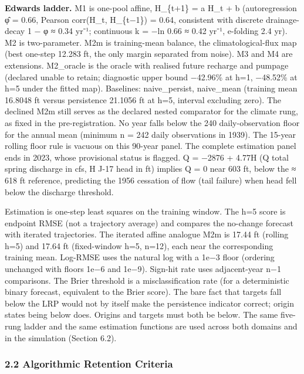 \documentclass[11pt]{article}
\begin{document}
\textbf{Edwards ladder.} M1 is one-pool affine, H\_\{t+1\} = a H\_t + b
(autoregression φ̂ = 0.66, Pearson corr(H\_t, H\_\{t−1\}) = 0.64,
consistent with discrete drainage-decay 1 − φ ≈ 0.34 yr⁻¹; continuous k
= −ln 0.66 ≈ 0.42 yr⁻¹, e-folding 2.4 yr). M2 is two-parameter. M2m is
training-mean balance, the climatological-flux map (best one-step 12.283
ft, the only margin separated from noise). M3 and M4 are extensions.
M2\_oracle is the oracle with realised future recharge and pumpage
(declared unable to retain; diagnostic upper bound −42.96\% at h=1,
−48.52\% at h=5 under the fitted map). Baselines: naive\_persist,
naive\_mean (training mean 16.8048 ft versus persistence 21.1056 ft at
h=5, interval excluding zero). The declined M2m still serves as the
declared nested comparator for the climate rung, as fixed in the
pre-registration. No year falls below the 240 daily-observation floor
for the annual mean (minimum n = 242 daily observations in 1939). The
15-year rolling floor rule is vacuous on this 90-year panel. The
complete estimation panel ends in 2023, whose provisional status is
flagged. Q = −2876 + 4.77H (Q total spring discharge in cfs, H J-17 head
in ft) implies Q = 0 near 603 ft, below the ≈ 618 ft reference,
predicting the 1956 cessation of flow (tail failure) when head fell
below the discharge threshold.

Estimation is one-step least squares on the training window. The h=5
score is endpoint RMSE (not a trajectory average) and compares the
no-change forecast with iterated trajectories. The iterated affine
analogue M2m is 17.44 ft (rolling h=5) and 17.64 ft (fixed-window h=5,
n=12), each near the corresponding training mean. Log-RMSE uses the
natural log with a 1e−3 floor (ordering unchanged with floors 1e−6 and
1e−9). Sign-hit rate uses adjacent-year n−1 comparisons. The Brier
threshold is a misclassification rate (for a deterministic binary
forecast, equivalent to the Brier score). The bare fact that targets
fall below the LRP would not by itself make the persistence indicator
correct; origin states being below does. Origins and targets must both
be below. The same five-rung ladder and the same estimation functions
are used across both domains and in the simulation (Section 6.2).

\subsubsection{2.2 Algorithmic Retention
Criteria}\label{algorithmic-retention-criteria}
\end{document}
